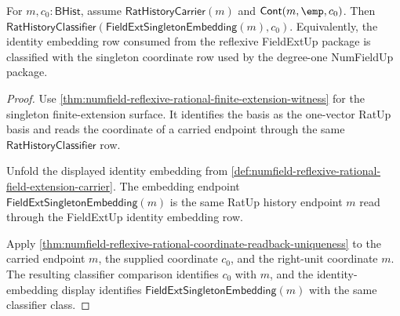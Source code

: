 \begin{theorem}
\label{thm:numfield-reflexive-rational-embedding-coordinate-compatibility}
For $m,c_0:\mathsf{BHist}$, assume
$\mathsf{RatHistoryCarrier}(m)$ and $\mathsf{Cont}(m,\emp,c_0)$. Then
$\mathsf{RatHistoryClassifier}(\mathsf{FieldExtSingletonEmbedding}(m),c_0)$.
Equivalently, the identity embedding row consumed from the reflexive
FieldExtUp package is classified with the singleton coordinate row used by the
degree-one NumFieldUp package.
\end{theorem}
\begin{proof}
Use
\autoref{thm:numfield-reflexive-rational-finite-extension-witness} for the
singleton finite-extension surface. It identifies the basis as the one-vector
RatUp basis and reads the coordinate of a carried endpoint through the same
$\mathsf{RatHistoryClassifier}$ row.

Unfold the displayed identity embedding from
\autoref{def:numfield-reflexive-rational-field-extension-carrier}. The
embedding endpoint $\mathsf{FieldExtSingletonEmbedding}(m)$ is the same RatUp
history endpoint $m$ read through the FieldExtUp identity embedding row.

Apply
\autoref{thm:numfield-reflexive-rational-coordinate-readback-uniqueness} to
the carried endpoint $m$, the supplied coordinate $c_0$, and the right-unit
coordinate $m$. The resulting classifier comparison identifies $c_0$ with
$m$, and the identity-embedding display identifies
$\mathsf{FieldExtSingletonEmbedding}(m)$ with the same classifier class.
\end{proof}

